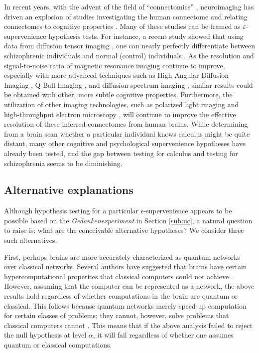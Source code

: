\documentclass{article}
\newcommand{\eps}{\varepsilon}
\begin{document}
In recent years, with the advent of the field of ``connectomics'' \cite{SpornsKotter05,Hagmann05}, neuroimaging has driven an explosion of studies investigating the human connectome and relating connectomes to cognitive properties \cite{Sporns10}. %
Many of these studies can be framed as $\eps$-supervenience hypothesis tests.  For instance, a recent study showed that using data from diffusion tensor imaging \cite{Basser94}, one can nearly perfectly differentiate between schizophrenic individuals and normal (control) individuals \cite{ArdekaniSzeszko10}.  As the resolution and signal-to-noise ratio of magnetic resonance imaging continue to improve, especially with more advanced techniques such as High Angular Diffusion Imaging \cite{TuchWedeen02}, Q-Ball Imaging \cite{Tuch04}, and diffusion spectrum imaging \cite{WedeenWeisskoff05}, similar results could be obtained with other, more subtle cognitive properties.  Furthermore, the utilization of other imaging technologies, such as polarized light imaging \cite{PalmAmunts10} and high-throughput electron microscopy \cite{DenkHorstmann04,HayworthLichtman06}, will continue to improve the effective resolution of these inferred connectomes from human brains. While determining from a brain scan whether a particular individual knows calculus might be quite distant, many other cognitive and psychological supervenience hypotheses have already been tested, and the gap between testing for calculus and testing for schizophrenia seems to be diminishing.





\subsection{Alternative explanations} %

Although hypothesis testing for a particular $\epsilon$-supervenience appears to be possible based on the \emph{Gedankenexperiment} in Section \ref{sub:uc}, a natural question to raise is: what are the conceivable alternative hypotheses?  We consider three such alternatives.  

First, perhaps brains are more accurately characterized as quantum networks over classical networks.  Several authors have suggested that brains have certain hypercomputational properties that classical computers could not achieve \cite{Penrose99,Satinover02}. However, assuming that the computer can be represented as a network, the above results hold regardless of whether computations in the brain are quantum or classical.  This follows because quantum networks merely speed up computation for certain classes of problems; they cannot, however, solve problems that classical computers cannot \cite{NielsenChuang00}.  This means that if the above analysis failed to reject the null hypothesis at level $\alpha$, it will fail regardless of whether one assumes quantum or classical computations.
\end{document}
